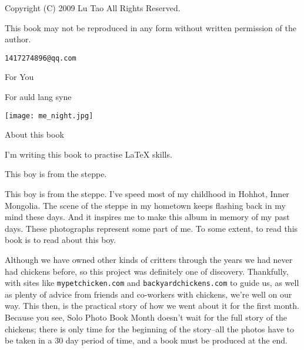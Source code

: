 %
%
% 
%

\vspace*{5in}
{\large Copyright (C) 2009 Lu Tao  All Rights Reserved.}

This book may not be reproduced in any form without written permission
of the author. 

{\tt 1417274896@qq.com}
\newpage

\vspace*{2in}
\begin{center}
{\LARGE For You}

{\large For auld lang syne}

\vspace*{0.5in}

\texttt{[image: me\_night.jpg]}
\end{center}
\newpage

\vspace*{1in}
{\LARGE About this book}

I'm writing this book to practise {LaTeX} skills.


\vspace*{0.25in}

{\LARGE This boy is from the steppe.}

This boy is from the steppe.
I've speed most of my childhood in Hohhot, Inner Mongolia. 
The scene of the steppe in my hometown keeps flashing back in my mind these days.  
And it inspires me to make this album in memory of my past days.
These photographs represent some part of me. 
To some extent, to read this book is to read about this boy.

Although we have owned other kinds of critters through the years we had
never had chickens before, so this project was definitely one of
discovery. 
Thankfully, with sites like {\tt mypetchicken.com} and 
{\tt backyardchickens.com} to
guide us, as well as plenty of advice from friends and co-workers with
chickens, we're well on our way. This then, is the practical story of
how we went about it for the first month. Because you see, Solo Photo
Book Month doesn't wait for the full story of the chickens; there is
only time for the beginning of the story--all the photos have to be taken
in a 30 day period of time, and a book must be produced at the end.

